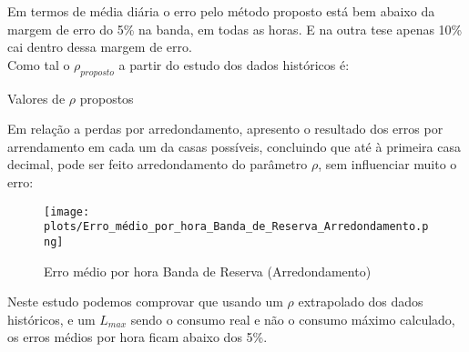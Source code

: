 Em termos de média diária o erro pelo método proposto está bem abaixo da margem de erro do 5\% na banda, em todas as horas. E na outra tese apenas 10\% cai dentro dessa margem de erro. \\

Como tal o $\rho_{proposto}$ a partir do estudo dos dados  históricos é: \

\begin{table}[H] \centering \caption{Valores de $\rho$ propostos}  \end{table}



Em relação a perdas por arredondamento, apresento o resultado dos erros por arrendamento em cada um da casas possíveis, concluindo que até à primeira casa decimal, pode ser feito arredondamento do parâmetro $\rho$, sem influenciar muito o erro: \\


\begin{figure}[H]
    \centering
    \texttt{[image: plots/Erro\_médio\_por\_hora\_Banda\_de\_Reserva\_Arredondamento.png]}
    \caption{Erro médio por hora Banda de Reserva (Arredondamento)}
\end{figure}



Neste estudo podemos comprovar que usando um $\rho$ extrapolado dos dados históricos, e um $L_{max}$ sendo o consumo real e não o consumo máximo calculado, os erros médios por hora ficam abaixo dos 5\%.\\